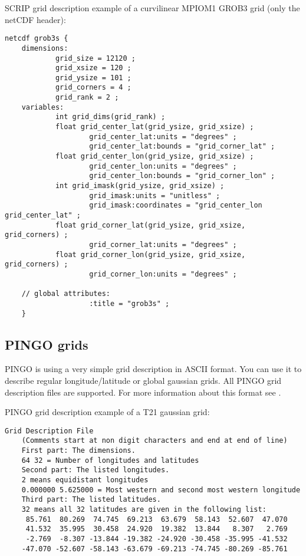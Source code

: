SCRIP grid description example of a curvilinear MPIOM1 GROB3 grid (only the netCDF header):
\begin{lstlisting}[frame=single, backgroundcolor=\color{zebg}, basicstyle=\footnotesize]
    netcdf grob3s {
    dimensions:
            grid_size = 12120 ;
            grid_xsize = 120 ;
            grid_ysize = 101 ;
            grid_corners = 4 ;
            grid_rank = 2 ;
    variables:
            int grid_dims(grid_rank) ;
            float grid_center_lat(grid_ysize, grid_xsize) ;
                    grid_center_lat:units = "degrees" ;
                    grid_center_lat:bounds = "grid_corner_lat" ;
            float grid_center_lon(grid_ysize, grid_xsize) ;
                    grid_center_lon:units = "degrees" ;
                    grid_center_lon:bounds = "grid_corner_lon" ;
            int grid_imask(grid_ysize, grid_xsize) ;
                    grid_imask:units = "unitless" ;
                    grid_imask:coordinates = "grid_center_lon grid_center_lat" ;
            float grid_corner_lat(grid_ysize, grid_xsize, grid_corners) ;
                    grid_corner_lat:units = "degrees" ;
            float grid_corner_lon(grid_ysize, grid_xsize, grid_corners) ;
                    grid_corner_lon:units = "degrees" ;

    // global attributes:
                    :title = "grob3s" ;
    }
\end{lstlisting}

\subsection{PINGO grids}

PINGO is using a very simple grid description in ASCII format.
You can use it to describe regular longitude/latitude or global gaussian grids.
All PINGO grid description files are supported. 
For more information about this format see \cite{PINGO}.

\vspace{2mm}

PINGO grid description example of a T21 gaussian grid:
\begin{lstlisting}[frame=single, backgroundcolor=\color{zebg}, basicstyle=\footnotesize]
    Grid Description File
    (Comments start at non digit characters and end at end of line)
    First part: The dimensions.
    64 32 = Number of longitudes and latitudes
    Second part: The listed longitudes.
    2 means equidistant longitudes
    0.000000 5.625000 = Most western and second most western longitude
    Third part: The listed latitudes.
    32 means all 32 latitudes are given in the following list:
     85.761  80.269  74.745  69.213  63.679  58.143  52.607  47.070
     41.532  35.995  30.458  24.920  19.382  13.844   8.307   2.769
     -2.769  -8.307 -13.844 -19.382 -24.920 -30.458 -35.995 -41.532
    -47.070 -52.607 -58.143 -63.679 -69.213 -74.745 -80.269 -85.761
\end{lstlisting}

